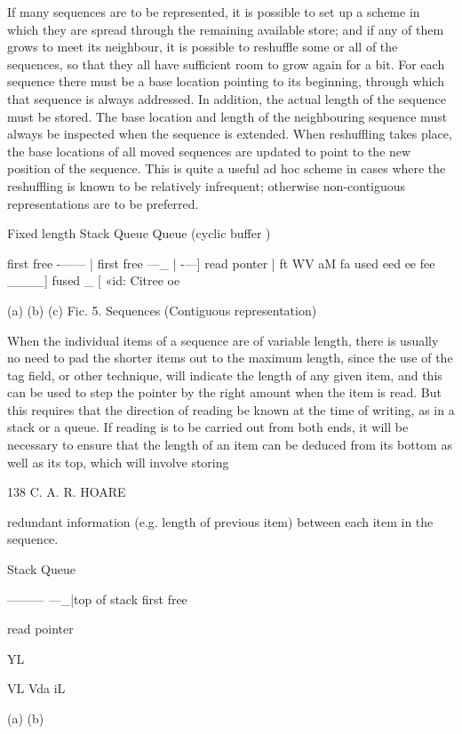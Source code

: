 {{{{				If many sequences are to be represented, it is possible to set up a scheme in which they are spread through the remaining available store; and if any of them grows to meet its neighbour, it is possible to reshuffle some or all of the sequences, so that they all have sufficient room to grow again for a bit. For each sequence there must be a base location pointing to its beginning, through which that sequence is always addressed. In addition, the actual length of the sequence must be stored. The base location and length of the neighbouring sequence must always be inspected when the sequence is extended. When reshuffling takes place, the base locations of all moved sequences are updated to point to the new position of the sequence. This is quite a useful ad hoc scheme in cases where the reshuffling is known to be relatively infrequent; otherwise non-contiguous representations are to be preferred.
				
				Fixed length Stack Queue Queue (cyclic buffer )
				
				
				first free -—— | first free —_ | -—] read ponter | ft WV aM fa used eed ee fee ____] fused _ [ «id: Citree oe
				
				(a) (b) (c) Fic. 5. Sequences (Contiguous representation)
				
				When the individual items of a sequence are of variable length, there is usually no need to pad the shorter items out to the maximum length, since the use of the tag field, or other technique, will indicate the length of any given item, and this can be used to step the pointer by the right amount when the item is read. But this requires that the direction of reading be known at the time of writing, as in a stack or a queue. If reading is to be carried out from both ends, it will be necessary to ensure that the length of an item can be deduced from its bottom as well as its top, which will involve storing
				
				138 C. A. R. HOARE
				
				redundant information (e.g. length of previous item) between each item in the sequence.
				
				Stack Queue
				
				——— —_|top of stack first free
				
				read pointer
				
				
				YL
				
				VL Vda iL
				
				
				
				(a) (b)
				
}}}}
